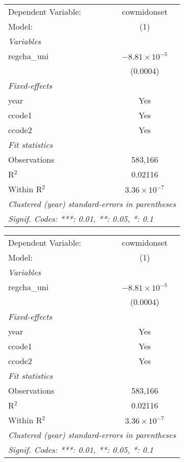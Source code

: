 \begingroup
\centering
\begin{tabular}{lc}
   \tabularnewline \midrule \midrule
   Dependent Variable: & cowmidonset\\  
   Model:              & (1)\\  
   \midrule
   \emph{Variables}\\
   regcha\_uni         & $-8.81\times 10^{-5}$\\    
                       & (0.0004)\\   
   \midrule
   \emph{Fixed-effects}\\
   year                & Yes\\  
   ccode1              & Yes\\  
   ccode2              & Yes\\  
   \midrule
   \emph{Fit statistics}\\
   Observations        & 583,166\\  
   R$^2$               & 0.02116\\  
   Within R$^2$        & $3.36\times 10^{-7}$\\   
   \midrule \midrule
   \multicolumn{2}{l}{\emph{Clustered (year) standard-errors in parentheses}}\\
   \multicolumn{2}{l}{\emph{Signif. Codes: ***: 0.01, **: 0.05, *: 0.1}}\\
\end{tabular}
\par\endgroup



\begingroup
\centering
\begin{tabular}{lc}
   \tabularnewline \midrule \midrule
   Dependent Variable: & cowmidonset\\  
   Model:              & (1)\\  
   \midrule
   \emph{Variables}\\
   regcha\_uni         & $-8.81\times 10^{-5}$\\    
                       & (0.0004)\\   
   \midrule
   \emph{Fixed-effects}\\
   year                & Yes\\  
   ccode1              & Yes\\  
   ccode2              & Yes\\  
   \midrule
   \emph{Fit statistics}\\
   Observations        & 583,166\\  
   R$^2$               & 0.02116\\  
   Within R$^2$        & $3.36\times 10^{-7}$\\   
   \midrule \midrule
   \multicolumn{2}{l}{\emph{Clustered (year) standard-errors in parentheses}}\\
   \multicolumn{2}{l}{\emph{Signif. Codes: ***: 0.01, **: 0.05, *: 0.1}}\\
\end{tabular}
\par\endgroup



